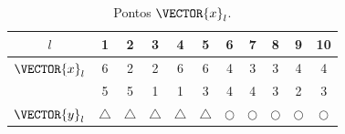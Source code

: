 \begin{table}[h!]
\centering
\begin{tabular}{|c||c|c|c|c|c||c|c|c|c|c||} 
 \hline
$l$            & 1 & 2 & 3 & 4 & 5 & 6 & 7 & 8 & 9 & 10 \\ \hline \hline
$\VECTOR{x}_l$ & 6 & 2 & 2 & 6 & 6 & 4 & 3 & 3 & 4 & 4 \\ 
~              & 5 & 5 & 1 & 1 & 3 & 4 & 4 & 3 & 2 & 3 \\ \hline
$\VECTOR{y}_l$ & $\bigtriangleup$ & $\bigtriangleup$ & $\bigtriangleup$ & $\bigtriangleup$ & $\bigtriangleup$ 
      & $\bigcirc$ & $\bigcirc$ & $\bigcirc$ & $\bigcirc$ & $\bigcirc$\\ \hline
\end{tabular}
\caption{Pontos $\VECTOR{x}_l$.}
\label{table:theo:reglogrnr1nolinear:xn}
\end{table}


